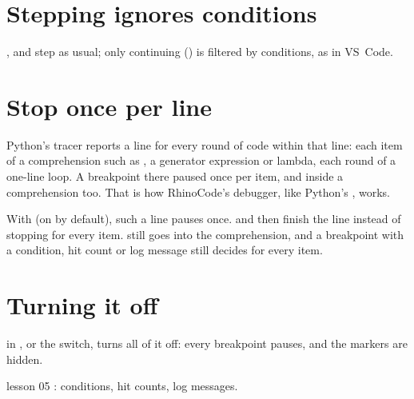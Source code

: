 \section{Stepping ignores conditions}

,  and  step as usual; only continuing () is filtered by
conditions, as in VS~Code.

\section{Stop once per line}\label{sec:onceperline}

Python's tracer reports a line for every round of code within that line: each item of a comprehension
such as , a generator expression or lambda, each round of a one-line loop.
A breakpoint there paused once per item, and  inside a comprehension too. That is how
RhinoCode's debugger, like Python's , works.

With  (on by default), such a line pauses once.  and
 then finish the line instead of stopping for every item.  still goes into
the comprehension, and a breakpoint with a condition, hit count or log message still decides for every
item.

\section{Turning it off}

 in , or the
 switch, turns all of it off: every breakpoint pauses, and the markers are hidden.

\begin{lesson}{lesson 05}
: conditions, hit counts, log messages.
\end{lesson}
